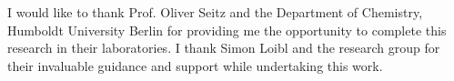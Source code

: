 

\begin{acknowledgements}      %

I would like to thank Prof. Oliver Seitz and the Department of Chemistry, Humboldt University Berlin for providing me the opportunity to complete this research in their laboratories. I thank Simon Loibl and the research group for their invaluable guidance and support while undertaking this work.


\end{acknowledgements}


